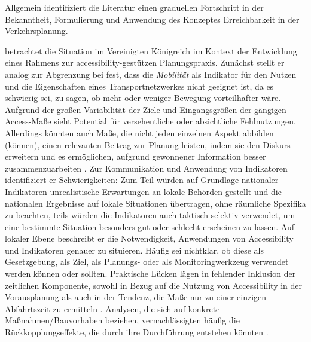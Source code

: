 \documentclass[11pt,pdftex,a4paper]{scrartcl}
\begin{document}
	Allgemein identifiziert die Literatur einen graduellen Fortschritt in der Bekanntheit, Formulierung und Anwendung des Konzeptes Erreichbarkeit in der Verkehrsplanung.
	
	\textcite{haldenUseAbuseAccessibility2011} betrachtet die Situation im Vereinigten Königreich im Kontext der Entwicklung eines Rahmens zur accessibility-gestützen Planungspraxis. Zunächst stellt er analog zur Abgrenzung bei \textcite{levinsonTransportAccessManual2020} fest, dass die \textit{Mobilität} als Indikator für den Nutzen und die Eigenschaften eines Transportnetzwerkes nicht geeignet ist, da es schwierig sei, zu sagen, ob mehr oder weniger Bewegung vorteilhafter wäre. %
	Aufgrund der großen Variabilität der Ziele und Eingangsgrößen der gängigen Access-Maße sieht \citeauthor{haldenUseAbuseAccessibility2011} Potential für versehentliche oder absichtliche Fehlnutzungen. Allerdings könnten auch Maße, die nicht jeden einzelnen Aspekt abbilden (können), einen relevanten Beitrag zur Planung leisten, indem sie den Diskurs erweitern und es ermöglichen, aufgrund gewonnener Information besser zusammenzuarbeiten \parencite[14f]{haldenUseAbuseAccessibility2011}. Zur Kommunikation und Anwendung von Indikatoren identifiziert er Schwierigkeiten: Zum Teil würden auf Grundlage nationaler Indikatoren unrealistische Erwartungen an lokale Behörden gestellt und die nationalen Ergebnisse auf lokale Situationen übertragen, ohne räumliche Spezifika zu beachten, teils würden die Indikatoren auch taktisch selektiv verwendet, um eine bestimmte Situation besonders gut oder schlecht erscheinen zu lassen. Auf lokaler Ebene beschreibt er die Notwendigkeit, Anwendungen von Accessibility und Indikatoren genauer zu situieren. Häufig sei nichtklar, ob diese als Gesetzgebung, als Ziel, als Planungs- oder als Monitoringwerkzeug verwendet werden können oder sollten. Praktische Lücken lägen in fehlender Inklusion der zeitlichen Komponente, sowohl in Bezug auf die Nutzung von Accessibility in der Vorausplanung als auch in der Tendenz, die Maße nur zu einer einzigen Abfahrtszeit zu ermitteln \parencite[16]{haldenUseAbuseAccessibility2011}. Analysen, die sich auf konkrete Maßnahmen/Bauvorhaben beziehen, vernachlässigten häufig die Rückkopplungseffekte, die durch ihre Durchführung entstehen könnten \parencite[17]{haldenUseAbuseAccessibility2011}.
	
\end{document}
